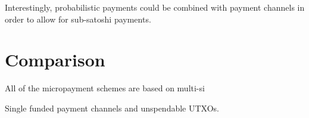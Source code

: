 Interestingly, probabilistic payments could be combined with payment channels in order to allow for sub-satoshi payments.








\section{Comparison}

All of the micropayment schemes are based on multi-si

Single funded payment channels and unspendable UTXOs.

